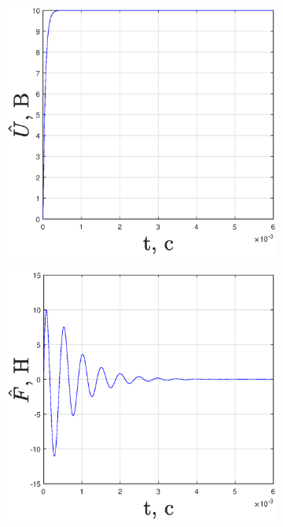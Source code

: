 \documentclass[fleqn, a4paper, 11pt, russian]{article}
\begin{document}
	\begin{figure}[ht!]
		\centering
		\begin{subfigure}[b]{0.49\textwidth}
			\includegraphics[width = \textwidth]{Base/baseU}
		\end{subfigure}
		\hfill
		\begin{subfigure}[b]{0.49\textwidth}
			\includegraphics[width = \textwidth]{Base/baseF}
		\end{subfigure}
		

\end{figure}
\end{document}
